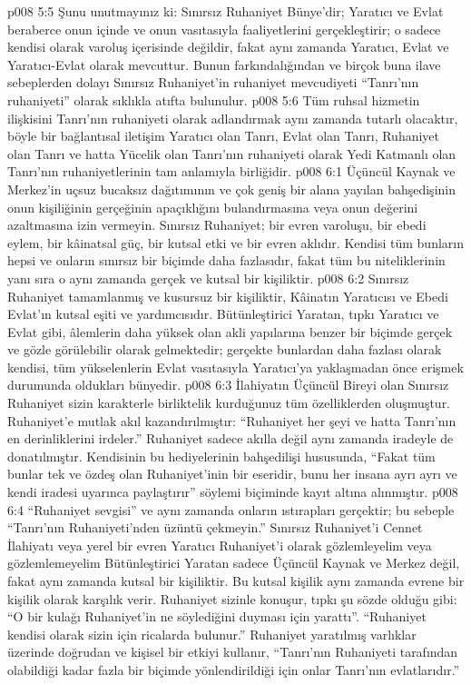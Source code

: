 \vs p008 5:5 Şunu unutmayınız ki: Sınırsız Ruhaniyet  Bünye’dir; Yaratıcı ve Evlat beraberce onun içinde ve onun vasıtasıyla faaliyetlerini gerçekleştirir; o sadece kendisi olarak varoluş içerisinde değildir, fakat aynı zamanda Yaratıcı, Evlat ve Yaratıcı\hyp{}Evlat olarak mevcuttur. Bunun farkındalığından ve birçok buna ilave sebeplerden dolayı Sınırsız Ruhaniyet’in ruhaniyet mevcudiyeti “Tanrı’nın ruhaniyeti” olarak sıklıkla atıfta bulunulur.
\vs p008 5:6 Tüm ruhsal hizmetin ilişkisini Tanrı’nın ruhaniyeti olarak adlandırmak aynı zamanda tutarlı olacaktır, böyle bir bağlantısal iletişim Yaratıcı olan Tanrı, Evlat olan Tanrı, Ruhaniyet olan Tanrı ve hatta Yücelik olan Tanrı’nın ruhaniyeti olarak Yedi Katmanlı olan Tanrı’nın ruhaniyetlerinin tam anlamıyla birliğidir.
\vs p008 6:1 Üçüncül Kaynak ve Merkez’in uçsuz bucaksız dağıtımının ve çok geniş bir alana yayılan bahşedişinin onun kişiliğinin gerçeğinin apaçıklığını bulandırmasına veya onun değerini azaltmasına izin vermeyin. Sınırsız Ruhaniyet; bir evren varoluşu, bir ebedi eylem, bir kâinatsal güç, bir kutsal etki ve bir evren aklıdır. Kendisi tüm bunların hepsi ve onların sınırsız bir biçimde daha fazlasıdır, fakat tüm bu niteliklerinin yanı sıra o aynı zamanda gerçek ve kutsal bir kişiliktir.
\vs p008 6:2 Sınırsız Ruhaniyet tamamlanmış ve kusursuz bir kişiliktir, Kâinatın Yaratıcısı ve Ebedi Evlat’ın kutsal eşiti ve yardımcısıdır. Bütünleştirici Yaratan, tıpkı Yaratıcı ve Evlat gibi, âlemlerin daha yüksek olan akli yapılarına benzer bir biçimde gerçek ve gözle görülebilir olarak gelmektedir; gerçekte bunlardan daha fazlası olarak kendisi, tüm yükselenlerin Evlat vasıtasıyla Yaratıcı’ya yaklaşmadan önce erişmek durumunda oldukları bünyedir.
\vs p008 6:3 İlahiyatın Üçüncül Bireyi olan Sınırsız Ruhaniyet sizin karakterle birliktelik kurduğunuz tüm özelliklerden oluşmuştur. Ruhaniyet’e mutlak akıl kazandırılmıştır: “Ruhaniyet her şeyi ve hatta Tanrı’nın en derinliklerini irdeler.” Ruhaniyet sadece akılla değil aynı zamanda iradeyle de donatılmıştır. Kendisinin bu hediyelerinin bahşedilişi hususunda, “Fakat tüm bunlar tek ve özdeş olan Ruhaniyet’inin bir eseridir, bunu her insana ayrı ayrı ve kendi iradesi uyarınca paylaştırır” söylemi biçiminde kayıt altına alınmıştır.
\vs p008 6:4 “Ruhaniyet sevgisi” ve aynı zamanda onların ıstırapları gerçektir; bu sebeple “Tanrı'nın Ruhaniyeti’nden üzüntü çekmeyin.” Sınırsız Ruhaniyet’i Cennet İlahiyatı veya yerel bir evren Yaratıcı Ruhaniyet’i olarak gözlemleyelim veya gözlemlemeyelim Bütünleştirici Yaratan sadece Üçüncül Kaynak ve Merkez değil, fakat aynı zamanda kutsal bir kişiliktir. Bu kutsal kişilik aynı zamanda evrene bir kişilik olarak karşılık verir. Ruhaniyet sizinle konuşur, tıpkı şu sözde olduğu gibi: “O bir kulağı Ruhaniyet’in ne söylediğini duyması için yarattı”. “Ruhaniyet kendisi olarak sizin için ricalarda bulunur.” Ruhaniyet yaratılmış varlıklar üzerinde doğrudan ve kişisel bir etkiyi kullanır, “Tanrı'nın Ruhaniyeti tarafından olabildiği kadar fazla bir biçimde yönlendirildiği için onlar Tanrı’nın evlatlarıdır.”
